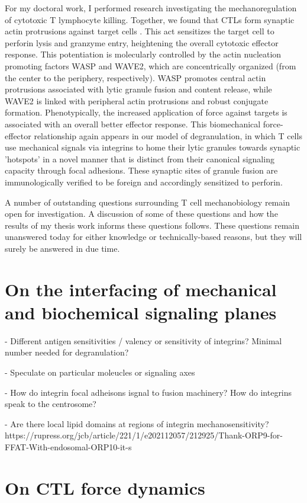 For my doctoral work, I performed research investigating the mechanoregulation of cytotoxic T lymphocyte killing. Together, we found that CTLs form synaptic actin protrusions against target cells \cite{Tamzalit2018}. This act sensitizes the target cell to perforin lysis and granzyme entry, heightening the overall cytotoxic effector response. This potentiation is molecularly controlled by the actin nucleation promoting factors WASP and WAVE2, which are concentrically organized (from the center to the periphery, respectively). WASP promotes central actin protrusions associated with lytic granule fusion and content release, while WAVE2 is linked with peripheral actin protrusions and robust conjugate formation. Phenotypically, the increased application of force against targets is associated with an overall better effector response. This biomechanical force-effector relationship again appears in our model of degranulation, in which T cells use mechanical signals via integrins to home their lytic granules towards synaptic 'hotspots' in a novel manner that is distinct from their canonical signaling capacity through focal adhesions. These synaptic sites of granule fusion are immunologically verified to be foreign and accordingly sensitized to perforin. 

A number of outstanding questions surrounding T cell mechanobiology remain open for investigation. A discussion of some of these questions and how the results of my thesis work informs these questions follows. These questions remain unanswered today for either knowledge or technically-based reasons, but they will surely be answered in due time.

\section{On the interfacing of mechanical and biochemical signaling planes}

- Different antigen sensitivities / valency or sensitivity of integrins? Minimal number needed for degranulation?

- Speculate on particular moleucles or signaling axes

- How do integrin focal adheisons isgnal to fusion machinery? How do integrins speak to the centrosome?

- Are there local lipid domains at regions of integrin mechanosensitivity? https://rupress.org/jcb/article/221/1/e202112057/212925/Thank-ORP9-for-FFAT-With-endosomal-ORP10-it-s

\section{On CTL force dynamics}

